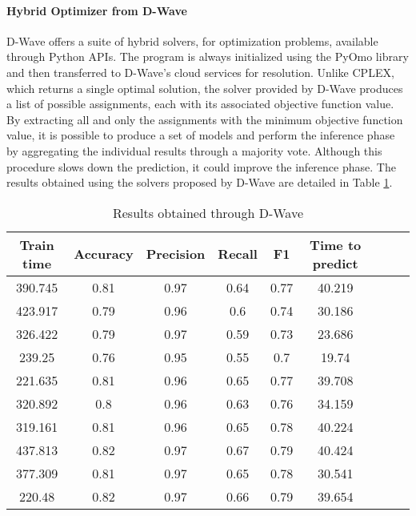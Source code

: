 \paragraph{Hybrid Optimizer from D-Wave} D-Wave offers a suite of hybrid solvers, for optimization problems, available through Python APIs\cite{hss}. The program is always initialized using the PyOmo library and then transferred to D-Wave's cloud services for resolution. Unlike CPLEX, which returns a single optimal solution, the solver provided by D-Wave produces a list of possible assignments, each with its associated objective function value. By extracting all and only the assignments with the minimum objective function value, it is possible to produce a set of models and perform the inference phase by aggregating the individual results through a majority vote. Although this procedure slows down the prediction, it could improve the inference phase. The results obtained using the solvers proposed by D-Wave are detailed in Table \ref{tab:QSVM2}.

\begin{table}[h]
    \centering
    \begin{tabular}{ccccccccc}
    \toprule
    Train time & Accuracy & Precision & Recall & F1    & Time to predict \\
    \midrule
    390.745    & 0.81     & 0.97      & 0.64   & 0.77  & 40.219          \\
    423.917    & 0.79     & 0.96      & 0.6    & 0.74  & 30.186          \\
    326.422    & 0.79     & 0.97      & 0.59   & 0.73  & 23.686          \\
    239.25     & 0.76     & 0.95      & 0.55   & 0.7   & 19.74           \\
    221.635    & 0.81     & 0.96      & 0.65   & 0.77  & 39.708          \\
    320.892    & 0.8      & 0.96      & 0.63   & 0.76  & 34.159          \\
    319.161    & 0.81     & 0.96      & 0.65   & 0.78  & 40.224          \\
    437.813    & 0.82     & 0.97      & 0.67   & 0.79  & 40.424          \\
    377.309    & 0.81     & 0.97      & 0.65   & 0.78  & 30.541          \\
    220.48     & 0.82     & 0.97      & 0.66   & 0.79  & 39.654          \\
    \bottomrule
    \end{tabular}
    \caption{Results obtained through D-Wave}
    \label{tab:QSVM2}
\end{table}

